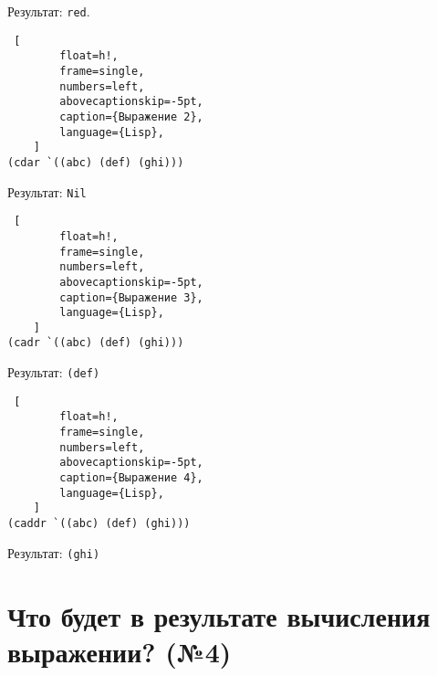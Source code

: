 Результат: \texttt{red}.

\begin{lstlisting} [
		float=h!,
		frame=single,
		numbers=left,
		abovecaptionskip=-5pt,
		caption={Выражение 2},
		language={Lisp},
	]
(cdar `((abc) (def) (ghi)))
\end{lstlisting}

Результат: \texttt{Nil}

\begin{lstlisting} [
		float=h!,
		frame=single,
		numbers=left,
		abovecaptionskip=-5pt,
		caption={Выражение 3},
		language={Lisp},
	]
(cadr `((abc) (def) (ghi)))
\end{lstlisting}

Результат: \texttt{(def)}
\clearpage

\begin{lstlisting} [
		float=h!,
		frame=single,
		numbers=left,
		abovecaptionskip=-5pt,
		caption={Выражение 4},
		language={Lisp},
	]
(caddr `((abc) (def) (ghi)))
\end{lstlisting}

Результат: \texttt{(ghi)}

\section{Что будет в результате вычисления выражении? (№4)}


